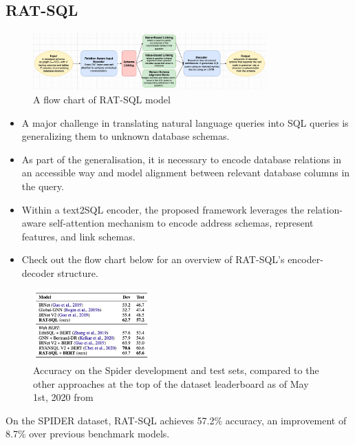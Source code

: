 \subsection*{RAT-SQL}

\begin{figure}[htb]
    \centering
    \includegraphics[width=0.8\textwidth]{pics/RAT-SQL/flow.png}
    \caption{A flow chart of RAT-SQL model}
    \label{fig:RAT-SQL-flow}
\end{figure}

\begin{itemize}
    \item A major challenge in translating natural language queries into SQL queries is generalizing them to unknown database schemas.
    \item As part of the generalisation, it is necessary to encode database relations in an accessible way and model alignment between relevant database columns in the query.
    \item Within a text2SQL encoder, the proposed framework leverages the relation-aware self-attention mechanism to encode address schemas, represent features, and link schemas.
    \item Check out the flow chart below for an overview of RAT-SQL's encoder-decoder structure.
\end{itemize}

\begin{figure}[htb]
    \centering
    \includegraphics[width=0.4\textwidth]{pics/RAT-SQL/Accuracy.png}
    \caption{Accuracy on the Spider development and test sets, compared to the other approaches at the top of the dataset leaderboard as of May 1st, 2020 from \cite{wang_rat-sql_2021}}
    \label{fig:RAT-SQL-Accuracy}
\end{figure}

On the SPIDER dataset, RAT-SQL achieves 57.2\% accuracy, an improvement of 8.7\% over previous benchmark models.


